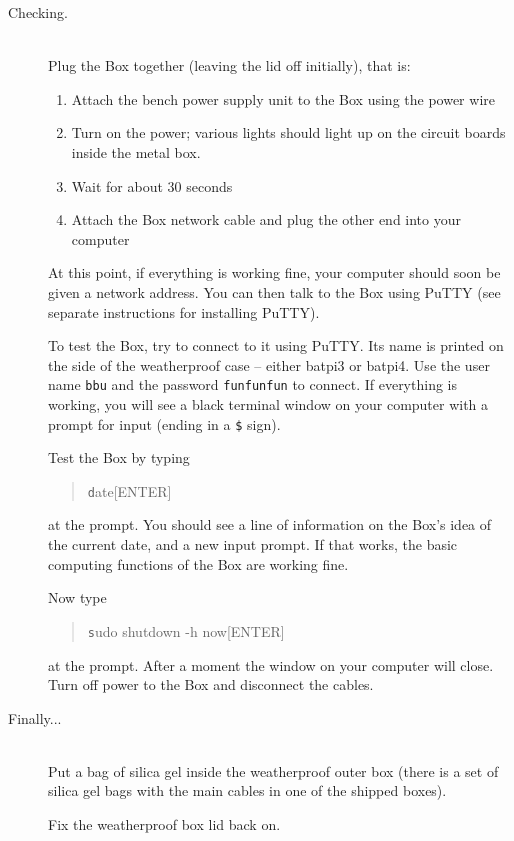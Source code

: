 \documentclass[12pt]{article}
\begin{document}
\begin{description}
\item[Checking.] ~\\

  Plug the Box together (leaving the lid off initially), that is:

  \begin{enumerate}
  \item  Attach the bench power supply unit to the Box using the power wire

  \item  Turn on the power;  various lights should light up on the circuit boards
       inside the metal box.

  \item  Wait for about 30 seconds

  \item  Attach the Box network cable and plug the other end into your computer
  \end{enumerate}

  At this point, if everything is working fine, your computer should
  soon be given a network address.  You can then talk to the Box using
  PuTTY (see separate instructions for installing PuTTY).

  To test the Box, try to connect to it using PuTTY.  Its name is
  printed on the side of the weatherproof case -- either batpi3 or
  batpi4.  Use the user name \texttt{bbu} and the password
  \texttt{funfunfun} to connect.  If everything is working, you will
  see a black terminal window on your computer with a prompt for input
  (ending in a \texttt{\$} sign).

  Test the Box by typing
\begin{quotation}\texttt
       date[ENTER]
\end{quotation}
  at the prompt.  You should see a line of information on the Box's
  idea of the current date, and a new input prompt.  If that works,
  the basic computing functions of the Box are working fine.

  Now type
\begin{quotation}\texttt
      sudo shutdown -h now[ENTER]
\end{quotation}
  at the prompt.  After a moment the window on your computer will
  close.  Turn off power to the Box and disconnect the cables.

  \item[Finally...] ~\\

  Put a bag of silica gel inside the weatherproof outer box (there is
  a set of silica gel bags with the main cables in one of the shipped
  boxes).

  Fix the weatherproof box lid back on.

\end{description}
\end{document}
